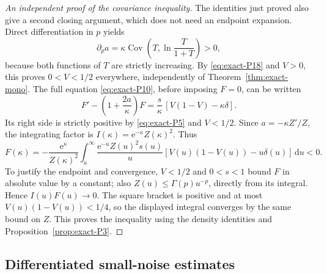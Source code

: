 \begin{proof}[An independent proof of the covariance inequality] The identities just proved also give a second closing argument, which does not need an endpoint expansion. Direct differentiation in \(p\) yields
\begin{equation}
 \partial_p a
 =\kappa\operatorname{Cov}\!\left(T,\ln\frac{T}{1+T}\right)>0,
\end{equation}
because both functions of \(T\) are strictly increasing. By \eqref{eq:exact-P18} and \(V>0\), this proves \(0<V<1/2\) everywhere, independently of Theorem~\ref{thm:exact-mono}. The full equation \eqref{eq:exact-P10}, before imposing \(F=0\), can be written
\begin{equation}
 F'-\left(1+\frac{2a}{\kappa}\right)F
 =\frac{s}{\kappa}\,[V(1-V)-\kappa\delta].
\end{equation}
Its right side is strictly positive by \eqref{eq:exact-P5} and \(V<1/2\). Since \(a=-\kappa Z'/Z\), the integrating factor is
\(I(\kappa)=\mathrm{e}^{-\kappa}Z(\kappa)^2\). Thus
\begin{equation}
 F(\kappa)
 =-\frac{\mathrm{e}^\kappa}{Z(\kappa)^2}
 \int_\kappa^\infty
   \frac{\mathrm{e}^{-u}Z(u)^2s(u)}{u}
       [V(u)(1-V(u))-u\delta(u)]\,\mathrm{d}u<0.               \label{eq:exact-P21a}
\end{equation}
To justify the endpoint and convergence, \(V<1/2\) and \(0<s<1\) bound \(F\) in absolute value by a constant; also
\(Z(u)\le\Gamma(p)u^{-p}\), directly from its integral.
Hence \(I(u)F(u)\to0\). The square bracket is positive and at most \(V(u)(1-V(u))<1/4\), so the displayed integral converges by the same bound on \(Z\).
This proves the inequality using the density identities and Proposition~\ref{prop:exact-P3}.\end{proof}

\subsection{Differentiated small-noise estimates}

